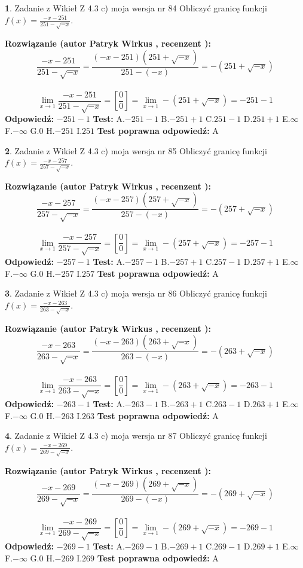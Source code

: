 \documentclass[12pt, a4paper]{article}
\theoremstyle{definition} %
\newtheorem{zad}{}
\newcommand{\zadStart}[1]{\begin{zad}#1\newline}
\newcommand{\zadStop}{\end{zad}}
\newcommand{\rozwStart}[2]{\noindent \textbf{Rozwiązanie (autor #1 , recenzent #2): }\newline}
\newcommand{\rozwStop}{\newline}
\newcommand{\odpStart}{\noindent \textbf{Odpowiedź:}\newline}
\newcommand{\odpStop}{\newline}
\newcommand{\testStart}{\noindent \textbf{Test:}\newline}
\newcommand{\testStop}{\newline}
\newcommand{\kluczStart}{\noindent \textbf{Test poprawna odpowiedź:}\newline}
\newcommand{\kluczStop}{\newline}
\begin{document}
\zadStart{Zadanie z Wikieł Z 4.3 c) moja wersja nr 84}
Obliczyć granicę funkcji $f(x)=\frac{-x-251}{251-\sqrt{-x}}$.
\zadStop
\rozwStart{Patryk Wirkus}{}
$$\frac{-x-251}{251-\sqrt{-x}}=\frac{(-x-251)(251+\sqrt{-x})}{251-(-x)}=-(251+\sqrt{-x})$$
\\
$$\lim\limits_{x\to1}\frac{-x-251}{251-\sqrt{-x}}=[\frac{0}{0}]=\lim\limits_{x\to1}-(251+\sqrt{-x}) =-251-1$$
\rozwStop
\odpStart
$-251-1$
\odpStop
\testStart
A.$-251-1$
B.$-251+1$
C.$251-1$
D.$251+1$
E.$\infty$
F.$-\infty$
G.$0$
H.$-251$
I.$251$
\testStop
\kluczStart
A
\kluczStop



\zadStart{Zadanie z Wikieł Z 4.3 c) moja wersja nr 85}
Obliczyć granicę funkcji $f(x)=\frac{-x-257}{257-\sqrt{-x}}$.
\zadStop
\rozwStart{Patryk Wirkus}{}
$$\frac{-x-257}{257-\sqrt{-x}}=\frac{(-x-257)(257+\sqrt{-x})}{257-(-x)}=-(257+\sqrt{-x})$$
\\
$$\lim\limits_{x\to1}\frac{-x-257}{257-\sqrt{-x}}=[\frac{0}{0}]=\lim\limits_{x\to1}-(257+\sqrt{-x}) =-257-1$$
\rozwStop
\odpStart
$-257-1$
\odpStop
\testStart
A.$-257-1$
B.$-257+1$
C.$257-1$
D.$257+1$
E.$\infty$
F.$-\infty$
G.$0$
H.$-257$
I.$257$
\testStop
\kluczStart
A
\kluczStop



\zadStart{Zadanie z Wikieł Z 4.3 c) moja wersja nr 86}
Obliczyć granicę funkcji $f(x)=\frac{-x-263}{263-\sqrt{-x}}$.
\zadStop
\rozwStart{Patryk Wirkus}{}
$$\frac{-x-263}{263-\sqrt{-x}}=\frac{(-x-263)(263+\sqrt{-x})}{263-(-x)}=-(263+\sqrt{-x})$$
\\
$$\lim\limits_{x\to1}\frac{-x-263}{263-\sqrt{-x}}=[\frac{0}{0}]=\lim\limits_{x\to1}-(263+\sqrt{-x}) =-263-1$$
\rozwStop
\odpStart
$-263-1$
\odpStop
\testStart
A.$-263-1$
B.$-263+1$
C.$263-1$
D.$263+1$
E.$\infty$
F.$-\infty$
G.$0$
H.$-263$
I.$263$
\testStop
\kluczStart
A
\kluczStop



\zadStart{Zadanie z Wikieł Z 4.3 c) moja wersja nr 87}
Obliczyć granicę funkcji $f(x)=\frac{-x-269}{269-\sqrt{-x}}$.
\zadStop
\rozwStart{Patryk Wirkus}{}
$$\frac{-x-269}{269-\sqrt{-x}}=\frac{(-x-269)(269+\sqrt{-x})}{269-(-x)}=-(269+\sqrt{-x})$$
\\
$$\lim\limits_{x\to1}\frac{-x-269}{269-\sqrt{-x}}=[\frac{0}{0}]=\lim\limits_{x\to1}-(269+\sqrt{-x}) =-269-1$$
\rozwStop
\odpStart
$-269-1$
\odpStop
\testStart
A.$-269-1$
B.$-269+1$
C.$269-1$
D.$269+1$
E.$\infty$
F.$-\infty$
G.$0$
H.$-269$
I.$269$
\testStop
\kluczStart
A
\kluczStop
\end{document}
